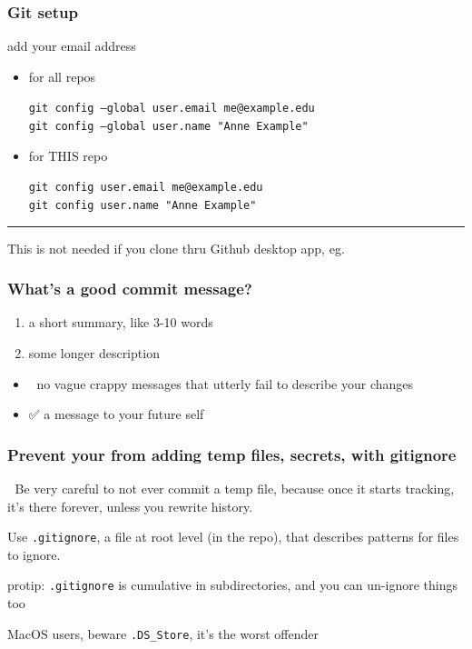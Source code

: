 \documentclass[14pt,aspectratio=1610]{beamer} %
\newcommand{\fframe}[2]{
   \begin{frame}
\frametitle{#1}
#2
\end{frame}
}
\begin{document}
\fframe{Git setup}
{
	add your email address

\begin{itemize}
	\item
	for all repos

	{\tt git config --global user.email me@example.edu} \\
	{\tt git config --global user.name "Anne Example"}

\item
	for THIS repo

	{\tt git config user.email me@example.edu} \\
	{\tt git config user.name "Anne Example"}

\end{itemize}
\vspace{0.5cm}

	\hrule

\vspace{0.5cm}

	This is not needed if you clone thru Github desktop app, eg.
}








\fframe{What's a good commit message?}
{
	\begin{enumerate}
		\item a short summary, like 3-10 words
		\item some longer description
	\end{enumerate}

\begin{itemize}
		\item 🚫 no vague crappy messages that utterly fail to describe your changes
		\item ✅ a message to your future self
	\end{itemize}
}

\fframe{Prevent your from adding temp files, secrets, with gitignore}
{
	🔴 Be very careful to not ever commit a temp file, because once it starts tracking, it's there forever, unless you rewrite history.

\vspace{\baselineskip}
	Use {\tt .gitignore}, a file at root level (in the repo), that describes patterns for files to ignore.

\vfill
	protip: {\tt .gitignore} is cumulative in subdirectories, and you can un-ignore things too

	\vspace{5mm}

	MacOS users, beware {\tt .DS\_Store}, it's the worst offender
}
\end{document}
